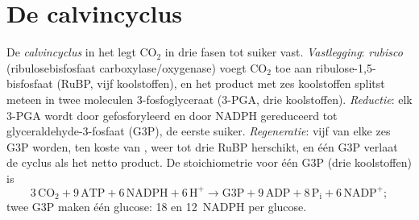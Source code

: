 \section{De calvincyclus}

\begin{definition}[Koolstofvastlegging]\label{def:b1:photosynthesis:fixation}
De \emph{calvincyclus} in het  legt $\mathrm{CO_2}$ in drie fasen tot suiker
vast. \emph{Vastlegging}: \emph{rubisco} (ribulosebisfosfaat
carboxylase/oxygenase) voegt $\mathrm{CO_2}$ toe aan ribulose-1,5-bisfosfaat (RuBP,
vijf koolstoffen), en het product met zes koolstoffen splitst meteen in twee
moleculen 3-fosfoglyceraat (3-PGA, drie koolstoffen). \emph{Reductie}: elk 3-PGA
wordt door  gefosforyleerd en door NADPH gereduceerd tot
glyceraldehyde-3-fosfaat (G3P), de eerste suiker. \emph{Regeneratie}: vijf van elke
zes G3P worden, ten koste van , weer tot drie RuBP herschikt, en één G3P
verlaat de cyclus als het netto product. De stoichiometrie voor één G3P (drie
koolstoffen) is
\[
3\,\mathrm{CO_2} + 9\,\mathrm{ATP} + 6\,\mathrm{NADPH} + 6\,\mathrm{H^+}
\to \text{G3P} + 9\,\mathrm{ADP} + 8\,\mathrm{P_i} + 6\,\mathrm{NADP^+} ;
\]
twee G3P maken één glucose: \qty{18}{}  en \qty{12}{NADPH} per glucose.
\end{definition}

